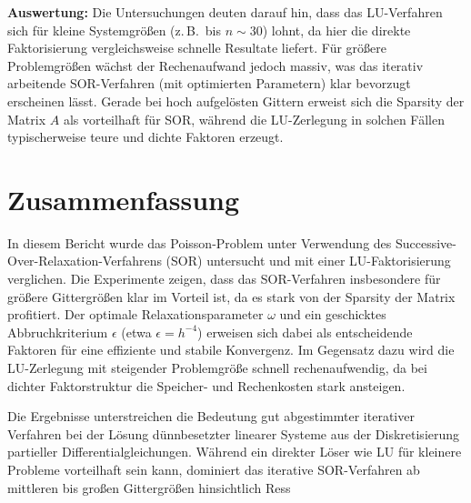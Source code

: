 \documentclass{scrartcl}
\begin{document}
\textbf{Auswertung:}
Die Untersuchungen deuten darauf hin, dass das LU-Verfahren sich für kleine
Systemgrößen (z.\,B.\ bis \(n \sim 30\)) lohnt, da hier die direkte
Faktorisierung vergleichsweise schnelle Resultate liefert. Für größere
Problemgrößen wächst der Rechenaufwand jedoch massiv, was das iterativ
arbeitende SOR-Verfahren (mit optimierten Parametern) klar bevorzugt erscheinen
lässt. Gerade bei hoch aufgelösten Gittern erweist sich die Sparsity der
Matrix \(A\) als vorteilhaft für SOR, während die LU-Zerlegung in solchen
Fällen typischerweise teure und dichte Faktoren erzeugt.

\section{Zusammenfassung}

In diesem Bericht wurde das Poisson-Problem unter Verwendung des
Successive-Over-Relaxation-Verfahrens (SOR) untersucht und mit einer
LU-Faktorisierung verglichen. Die Experimente zeigen, dass das SOR-Verfahren
insbesondere für größere Gittergrößen klar im Vorteil ist, da es stark von der
Sparsity der Matrix profitiert. Der optimale Relaxationsparameter \(\omega\)
und ein geschicktes Abbruchkriterium \(\epsilon\) (etwa \(\epsilon = h^{-4}\))
erweisen sich dabei als entscheidende Faktoren für eine effiziente und stabile
Konvergenz. Im Gegensatz dazu wird die LU-Zerlegung mit steigender Problemgröße
schnell rechenaufwendig, da bei dichter Faktorstruktur die Speicher- und
Rechenkosten stark ansteigen.

Die Ergebnisse unterstreichen die Bedeutung gut abgestimmter iterativer
Verfahren bei der Lösung dünnbesetzter linearer Systeme aus der Diskretisierung
partieller Differentialgleichungen. Während ein direkter Löser wie LU für
kleinere Probleme vorteilhaft sein kann, dominiert das iterative SOR-Verfahren
ab mittleren bis großen Gittergrößen hinsichtlich Ress

\printbibliography
\end{document}
